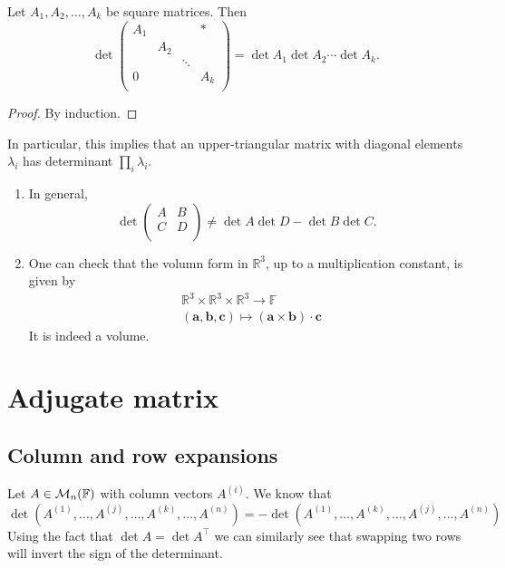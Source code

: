 \documentclass[a4paper]{article}
\begin{document}
\begin{corollary}
	Let $ A_1,A_2,\dots,A_k $ be square matrices. Then 
	\[
		\det \begin{pmatrix}
			A_1 &  &  &  * \\
			 & A_2 &  &   \\
			 &  & \ddots &   \\
			0 &  &  &  A_k \\
		\end{pmatrix}= \det A_1 \det A_2\cdots \det A_k. 
	\]
\end{corollary}
\begin{proof}
By induction. 
\end{proof}
In particular, this implies that an upper-triangular matrix with diagonal elements $ \lambda_i $ has determinant $ \prod_i \lambda_i $.
\begin{remark}
	\begin{enumerate}
		\item In general,
		\[
			\det \begin{pmatrix}
				A &  B \\
				C &  D \\
			\end{pmatrix}\neq \det A\det D - \det B \det C. 
		\]
		\item One can check that the volumn form in $ \mathbb{R}^{3} $, up to a multiplication constant, is given by 
		\begin{align*}
			& \mathbb{R}^{3} \times \mathbb{R}^{3} \times \mathbb{R}^{3} \to \mathbb{F}\\ 
			& (\mathbf{a},\mathbf{b},\mathbf{c}) \mapsto (\mathbf{a} \times \mathbf{b})\cdot \mathbf{c}
		\end{align*}
		It is indeed a volume. 
	\end{enumerate}
\end{remark}

\section{Adjugate matrix}

\subsection{Column and row expansions}
Let $ A \in {\mathcal{M}}_n({\mathbb{F}}) $ with column vectors $ A^{(i)} $.
We know that
\[
	\det(A^{(1)}, \dots, A^{(j)}, \dots, A^{(k)}, \dots, A^{(n)}) = -\det(A^{(1)}, \dots, A^{(k)}, \dots, A^{(j)}, \dots, A^{(n)})
\]
Using the fact that $ \det A = \det A^\top $ we can similarly see that swapping two rows will invert the sign of the determinant.
\end{document}
